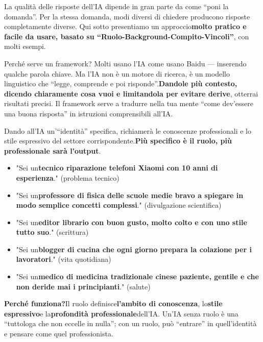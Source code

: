 
La qualità delle risposte dell'IA dipende in gran parte da come “poni la domanda”. Per la stessa domanda, modi diversi di chiedere producono risposte completamente diverse. Qui sotto presentiamo un approccio\textbf{molto pratico e facile da usare, basato su “Ruolo-Background-Compito-Vincoli”}, con molti esempi.

\begin{tcbinfo}{Perché serve un framework?}
Molti usano l'IA come usano Baidu — inserendo qualche parola chiave. Ma l'IA non è un motore di ricerca, è un modello linguistico che “legge, comprende e poi risponde”.\textbf{Dandole più contesto, dicendo chiaramente cosa vuoi e limitandola per evitare derive}, otterrai risultati precisi. Il framework serve a tradurre nella tua mente “come dev'essere una buona risposta” in istruzioni comprensibili all'IA.

\end{tcbinfo}


Dando all'IA un'“identità” specifica, richiamerà le conoscenze professionali e lo stile espressivo del settore corrispondente.\textbf{Più specifico è il ruolo, più professionale sarà l'output}.


\begin{itemize}
  \item "Sei un\textbf{tecnico riparazione telefoni Xiaomi con 10 anni di esperienza}." (problema tecnico)
  \item "Sei un\textbf{professore di fisica delle scuole medie bravo a spiegare in modo semplice concetti complessi}." (divulgazione scientifica)
  \item "Sei un\textbf{editor librario con buon gusto, molto colto e con uno stile tutto suo}." (scrittura)
  \item "Sei un\textbf{blogger di cucina che ogni giorno prepara la colazione per i lavoratori}." (vita quotidiana)
  \item "Sei un\textbf{medico di medicina tradizionale cinese paziente, gentile e che non deride mai i principianti}." (salute)
\end{itemize}

\textbf{Perché funziona?}Il ruolo definisce\textbf{l'ambito di conoscenza}, lo\textbf{stile espressivo}e la\textbf{profondità professionale}dell'IA. Un'IA senza ruolo è una “tuttologa che non eccelle in nulla”; con un ruolo, può “entrare” in quell'identità e pensare come quel professionista.

